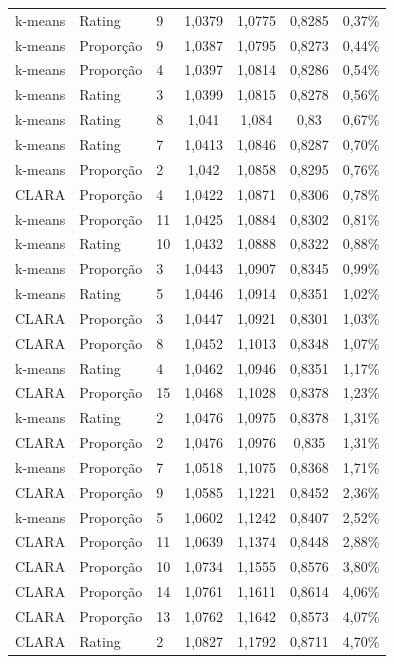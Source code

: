 \documentclass[12pt,a4paper,header]{abnt}
\begin{document}
{\begin{longtable}{@{}lllcccc@{}}
k-means & Rating & 9 & 1,0379 & 1,0775 & 0,8285 & 0,37\% \\
k-means & Proporção & 9 & 1,0387 & 1,0795 & 0,8273 & 0,44\% \\
k-means & Proporção & 4 & 1,0397 & 1,0814 & 0,8286 & 0,54\% \\
k-means & Rating & 3 & 1,0399 & 1,0815 & 0,8278 & 0,56\% \\
k-means & Rating & 8 & 1,041 & 1,084 & 0,83 & 0,67\% \\
k-means & Rating & 7 & 1,0413 & 1,0846 & 0,8287 & 0,70\% \\
k-means & Proporção & 2 & 1,042 & 1,0858 & 0,8295 & 0,76\% \\
CLARA & Proporção & 4 & 1,0422 & 1,0871 & 0,8306 & 0,78\% \\
k-means & Proporção & 11 & 1,0425 & 1,0884 & 0,8302 & 0,81\% \\
k-means & Rating & 10 & 1,0432 & 1,0888 & 0,8322 & 0,88\% \\
k-means & Proporção & 3 & 1,0443 & 1,0907 & 0,8345 & 0,99\% \\
k-means & Rating & 5 & 1,0446 & 1,0914 & 0,8351 & 1,02\% \\
CLARA & Proporção & 3 & 1,0447 & 1,0921 & 0,8301 & 1,03\% \\
CLARA & Proporção & 8 & 1,0452 & 1,1013 & 0,8348 & 1,07\% \\
k-means & Rating & 4 & 1,0462 & 1,0946 & 0,8351 & 1,17\% \\
CLARA & Proporção & 15 & 1,0468 & 1,1028 & 0,8378 & 1,23\% \\
k-means & Rating & 2 & 1,0476 & 1,0975 & 0,8378 & 1,31\% \\
CLARA & Proporção & 2 & 1,0476 & 1,0976 & 0,835 & 1,31\% \\
k-means & Proporção & 7 & 1,0518 & 1,1075 & 0,8368 & 1,71\% \\
CLARA & Proporção & 9 & 1,0585 & 1,1221 & 0,8452 & 2,36\% \\
k-means & Proporção & 5 & 1,0602 & 1,1242 & 0,8407 & 2,52\% \\
CLARA & Proporção & 11 & 1,0639 & 1,1374 & 0,8448 & 2,88\% \\
CLARA & Proporção & 10 & 1,0734 & 1,1555 & 0,8576 & 3,80\% \\
CLARA & Proporção & 14 & 1,0761 & 1,1611 & 0,8614 & 4,06\% \\
CLARA & Proporção & 13 & 1,0762 & 1,1642 & 0,8573 & 4,07\% \\
CLARA & Rating & 2 & 1,0827 & 1,1792 & 0,8711 & 4,70\% \\

\end{longtable}}
\end{document}
